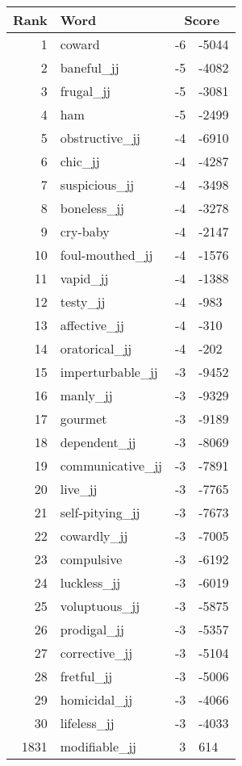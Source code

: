 \begin{longtable}[!htbp]{| rlr@{.}l |}
    \hline
    \textbf{Rank} & \textbf{Word} & \multicolumn{2}{c|}{\textbf{Score}} \\
    \hline
    \endhead
    1 & coward & -6 & -5044 \\
    2 & baneful\_jj & -5 & -4082 \\
    3 & frugal\_jj & -5 & -3081 \\
    4 & ham & -5 & -2499 \\
    5 & obstructive\_jj & -4 & -6910 \\
    6 & chic\_jj & -4 & -4287 \\
    7 & suspicious\_jj & -4 & -3498 \\
    8 & boneless\_jj & -4 & -3278 \\
    9 & cry-baby & -4 & -2147 \\
    10 & foul-mouthed\_jj & -4 & -1576 \\
    11 & vapid\_jj & -4 & -1388 \\
    12 & testy\_jj & -4 & -983 \\
    13 & affective\_jj & -4 & -310 \\
    14 & oratorical\_jj & -4 & -202 \\
    15 & imperturbable\_jj & -3 & -9452 \\
    16 & manly\_jj & -3 & -9329 \\
    17 & gourmet & -3 & -9189 \\
    18 & dependent\_jj & -3 & -8069 \\
    19 & communicative\_jj & -3 & -7891 \\
    20 & live\_jj & -3 & -7765 \\
    21 & self-pitying\_jj & -3 & -7673 \\
    22 & cowardly\_jj & -3 & -7005 \\
    23 & compulsive & -3 & -6192 \\
    24 & luckless\_jj & -3 & -6019 \\
    25 & voluptuous\_jj & -3 & -5875 \\
    26 & prodigal\_jj & -3 & -5357 \\
    27 & corrective\_jj & -3 & -5104 \\
    28 & fretful\_jj & -3 & -5006 \\
    29 & homicidal\_jj & -3 & -4066 \\
    30 & lifeless\_jj & -3 & -4033 \\
    1831 & modifiable\_jj & 3 & 614 \\

\end{longtable}
